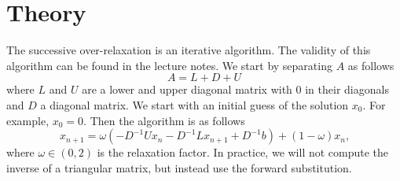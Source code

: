 \section{Theory}

The successive over-relaxation is an iterative algorithm. The validity of this algorithm can be found in the lecture notes\cite{nla}. We start by separating \(A\) as follows
\[
    A = L + D + U
\]
where \(L\) and \(U\) are a lower and upper diagonal matrix with \(0\) in their diagonals and \(D\) a diagonal matrix. We start with an initial guess of the solution \(x_0\). For example, \(x_0 = 0\). Then the algorithm is as follows
\[
    x_{n + 1} = \omega (-D^{-1} U x_n - D^{-1}L x_{n + 1} + D^{-1} b) + (1 - \omega) x_n \text{,}
\]
where \(\omega \in (0, 2)\) is the relaxation factor. In practice, we will not compute the inverse of a triangular matrix, but instead use the forward substitution.